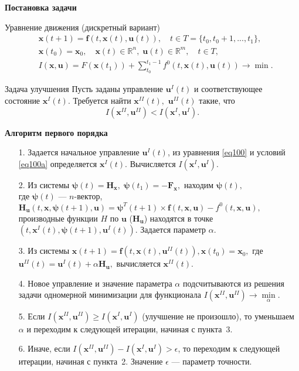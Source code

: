 \documentclass[10pt]{beamer}
\begin{document}
\begin{frame}{\textbf{Постановка задачи} }
\begin{block}{Уравнение движения (дискретный вариант)}
  \begin{align}
&\mathbf{x}(t+1)=\mathbf{f}(t,\mathbf{x}(t),\mathbf{u}(t)),\quad t \in T=\{t_0,t_0+1,...,t_1\},
	\label{eq100} \\
&\mathbf{x}(t_0)=\mathbf{x}_0,\quad \mathbf{x}(t)\in \mathbb{R}^n,\; \mathbf{u}(t) \in \mathbb{R}^m,\quad t\in T,\label{eq100a} \\
&I(\mathbf{x},\mathbf{u})=F(\mathbf{x}(t_1))+ \sum_{t_0}^{t_1-1}f^0(t,\mathbf{x}(t),\mathbf{u}(t)) \to \min.
  \label{eq103}
  \end{align}
\end{block}
\begin{block}{Задача улучшения}
  Пусть заданы управление $\mathbf{u}^I(t)$ и соответствующее состояние $\mathbf{x}^I(t)$. Требуется найти $\mathbf{x}^{I\!I}(t),$ $\mathbf{u}^{I\!I}(t)$ такие, что
\[
I(\mathbf{x}^{I\!I},\mathbf{u}^{I\!I}) < I(\mathbf{x}^I,\mathbf{u}^I).
\]
 \end{block}
\end{frame}
\def\H{\mathbf{H}}
\def\x{\mathbf{x}}
\def\u{\mathbf{u}}
\def\f{\mathbf{f}}
\def\F{\mathbf{F}}
\def\bpsi{\mathbf{\psi}}
\begin{frame}[shrink]{\textbf{Алгоритм первого порядка} }
\begin{enumerate}
 \item[1.] Задается начальное управление $\mathbf{u}^I(t)$, из уравнения \eqref{eq100} и условий \eqref{eq100a} определяется $\mathbf{x}^I(t)$. Вычисляется $I(\mathbf{x}^I,\mathbf{u}^I).$
 \item[2.] Из системы $\mathbf{\psi}(t)=\mathbf{H}_\mathbf{x},\;\bpsi(t_1)=-\F_\x,$ находим $\bpsi(t),$\\ где $\bpsi(t)$ --- $n$-вектор, $\H_\u(t,\x,\bpsi(t+1),\u)=\bpsi^{T}(t+1)\times\f(t,\x,\u)-f^{0}(t,\x,\u),$ производные функции $H$ по $\u$ ($\H_\u$) находятся в точке $\left(t,\x^{I}(t),\bpsi \left(t+1 \right),\u^{I}(t)\right)$. Задается параметр $\alpha$.
 \item[3.] Из системы $\x(t+1)=\f(t,\x(t),\u^{I\!I}(t)), \x(t_0)=\x_0,$ где $\u^{I\!I}(t)=\u^{I}(t)+\alpha \H_\u,$ вычисляется $\x^{I\!I}(t).$
 \item[4.] Новое управление и значение параметра $\alpha$ подсчитываются из решения задачи одномерной минимизации для функционала $I(\x^{I\!I},\u^{I\!I})\to \min\limits_{\alpha}.$
 \item[5.] Если $I\left(\x^{I\!I},\u^{I\!I}\right)\geq I\left(\x^{I},\u^{I}\right)$ (улучшение не произошло), то уменьшаем $\alpha$ и переходим к следующей итерации, начиная с пункта~3.
 \item[6.] Иначе, если $I\left(\x^{I\!I},\u^{I\!I}\right) - I\left(\x^{I},\u^{I}\right)>\epsilon$, то переходим к следующей итерации, начиная с пункта~2. Значение $\epsilon$ --- параметр точности.
\end{enumerate}
\end{frame}
\end{document}
